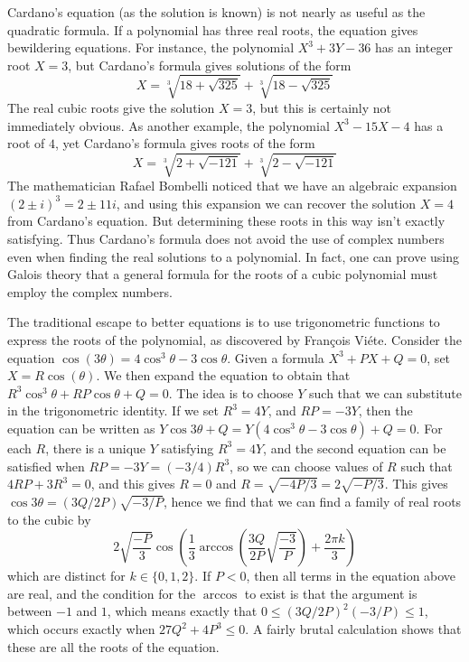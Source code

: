 Cardano's equation (as the solution is known) is not nearly as useful as the quadratic formula. If a polynomial has three real roots, the equation gives bewildering equations. For instance, the polynomial $X^3 + 3Y - 36$ has an integer root $X = 3$, but Cardano's formula gives solutions of the form
%
\[ X = \sqrt[3]{18 + \sqrt{325}} + \sqrt[3]{18 - \sqrt{325}} \]
%
The real cubic roots give the solution $X = 3$, but this is certainly not immediately obvious. As another example, the polynomial $X^3 - 15X - 4$ has a root of $4$, yet Cardano's formula gives roots of the form
%
\[ X = \sqrt[3]{2 + \sqrt{-121}} + \sqrt[3]{2 - \sqrt{-121}} \]
%
The mathematician Rafael Bombelli noticed that we have an algebraic expansion $(2 \pm i)^3 = 2 \pm 11 i$, and using this expansion we can recover the solution $X = 4$ from Cardano's equation. But determining these roots in this way isn't exactly satisfying. Thus Cardano's formula does not avoid the use of complex numbers even when finding the real solutions to a polynomial. In fact, one can prove using Galois theory that a general formula for the roots of a cubic polynomial must employ the complex numbers.

The traditional escape to better equations is to use trigonometric functions to express the roots of the polynomial, as discovered by Fran\c{c}ois Vi\'{e}te. Consider the equation $\cos(3 \theta) = 4 \cos^3 \theta - 3 \cos \theta$. Given a formula $X^3 + PX + Q = 0$, set $X = R \cos(\theta)$. We then expand the equation to obtain that $R^3 \cos^3 \theta + R P \cos \theta + Q = 0$. The idea is to choose $Y$ such that we can substitute in the trigonometric identity. If we set $R^3 = 4Y$, and $RP = -3Y$, then the equation can be written as $Y \cos 3 \theta + Q = Y(4 \cos^3 \theta - 3 \cos \theta) + Q = 0$. For each $R$, there is a unique $Y$ satisfying $R^3 = 4Y$, and the second equation can be satisfied when $RP = -3Y = (-3/4)R^3$, so we can choose values of $R$ such that $4RP + 3R^3 = 0$, and this gives $R = 0$ and $R = \sqrt{-4P/3} = 2\sqrt{-P/3}$. This gives $\cos 3 \theta = (3Q/2P) \sqrt{-3/P}$, hence we find that we can find a family of real roots to the cubic by
%
\[ 2 \sqrt{\frac{-P}{3}} \cos \left( \frac{1}{3} \arccos \left( \frac{3Q}{2P} \sqrt{\frac{-3}{P}} \right) + \frac{2 \pi k}{3} \right) \]
%
which are distinct for $k \in \{ 0, 1, 2 \}$. If $P < 0$, then all terms in the equation above are real, and the condition for the $\arccos$ to exist is that the argument is between $-1$ and $1$, which means exactly that $0 \leq (3Q/2P)^2 (-3/P) \leq 1$, which occurs exactly when $27Q^2 + 4P^3 \leq 0$. A fairly brutal calculation shows that these are all the roots of the equation.

